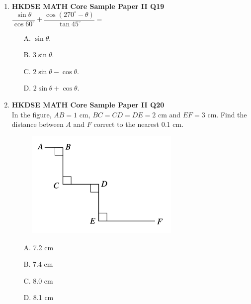 \documentclass[12pt]{article}
\begin{document}
\begin{enumerate}
	\item \textbf{HKDSE MATH Core Sample Paper II Q19}\\
	$\dfrac{\sin{\theta}}{\cos{60^\circ}} + \dfrac{\cos{(270^\circ - \theta)}}{\tan{45^\circ}} = $ 
	\begin{enumerate}
		\item[A.] $\sin{\theta}$.
		\item[B.] $3\sin{\theta}$.
		\item[C.] $2\sin{\theta} - \cos{\theta}$.
		\item[D.] $2\sin{\theta} + \cos{\theta}$.
	\end{enumerate}

	\item \textbf{HKDSE MATH Core Sample Paper II Q20}\\
	In the figure, $AB = 1$ cm, $BC = CD = DE = 2$ cm and $EF = 3$ cm. Find the distance between $A$ and $F$ correct to the nearest 0.1 cm.
	\begin{figure}[H]
		\centering
		\includegraphics[width = 0.7\textwidth]{SPFigure2.20.png}	
	\end{figure}
	\begin{enumerate}
		\item[A.] 7.2 cm
		\item[B.] 7.4 cm
		\item[C.] 8.0 cm
		\item[D.] 8.1 cm
	\end{enumerate}


\end{enumerate}
\end{document}
